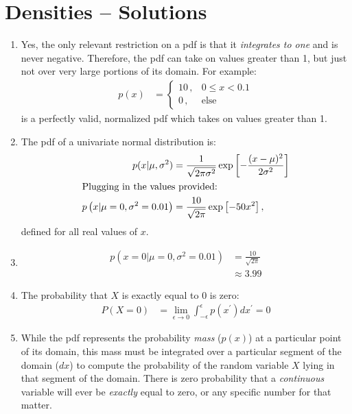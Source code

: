 \documentclass[submit]{harvardml}
\begin{document}
\section*{Densities -- Solutions}
\begin{enumerate}[label=(\alph*)]
  \item Yes, the only relevant restriction on a pdf is that it
    \textit{integrates to one} and is never negative. Therefore, the
    pdf can take on values greater than 1, but just not over very
    large portions of its domain. For example:
    \begin{align*}
      p(x) &= \begin{cases}
        10 \,, & 0 \leq x < 0.1\\
        0\,, & \mathrm{else}
      \end{cases}
    \end{align*}
    is a perfectly valid, normalized pdf which takes on values greater
    than 1.
  \item
    The pdf of a univariate normal distribution is:
    \begin{align*}
      p(x|\mu,\sigma^2) &= \frac{1}{\sqrt{2\pi\sigma^2}}
      \exp\left[-\frac{(x-\mu)^2}{2\sigma^2}\right]\\
      \intertext{Plugging in the values provided:}
      p\left(x | \mu=0, \sigma^2=0.01\right) &= \frac{10}{\sqrt{2\pi}}\exp\left[-50x^2\right], 
    \end{align*}
    defined for all real values of $x$.
  \item
    \begin{align*}
      p\left(x=0 | \mu=0, \sigma^2=0.01\right) &=
      \frac{10}{\sqrt{2\pi}}\\
      &\approx 3.99
    \end{align*}
  \item
    The probability that $X$ is exactly equal to $0$ is zero:
    \begin{align*}
      P(X = 0) &= \lim_{\epsilon \rightarrow 0}
      \int_{-\epsilon}^{\epsilon} p(x^\prime) dx^\prime = 0
    \end{align*}
  \item
    While the pdf represents the probability \textit{mass} ($p(x)$) at a
    particular point of its domain, this mass must be integrated over
    a particular segment of the domain ($dx$) to compute the
    probability of the random variable $X$ lying in that segment of
    the domain. There is zero probability that a \textit{continuous}
    variable will ever be \textit{exactly} equal to zero, or any
    specific number for that matter.
\end{enumerate}
\newpage
\end{document}
